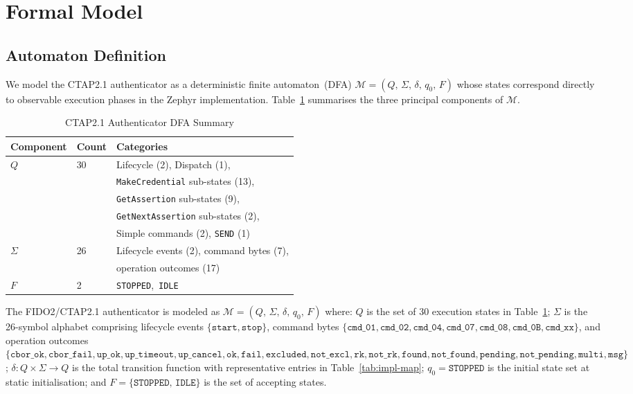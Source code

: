 \section{Formal Model}
\label{sec:formal}

\subsection{Automaton Definition}
\label{sec:formal:def}

We model the CTAP2.1 authenticator as a deterministic finite automaton~(DFA) $\mathcal{M} = (Q,\,\Sigma,\,\delta,\,q_0,\,F)$ whose states correspond directly to observable execution phases in the Zephyr implementation. Table~\ref{tab:dfa-summary} summarises the three principal components of $\mathcal{M}$.

\begin{table}[t]
\renewcommand{\arraystretch}{1.2}
\caption{CTAP2.1 Authenticator DFA Summary}
\label{tab:dfa-summary}
\centering
\begin{tabular}{@{}lll@{}}
\toprule
Component & Count & Categories \\
\midrule
$Q$ & 30 &
  Lifecycle (2), Dispatch (1), \\[-1pt]
  & & \texttt{MakeCredential} sub-states (13), \\[-1pt]
  & & \texttt{GetAssertion} sub-states (9), \\[-1pt]
  & & \texttt{GetNextAssertion} sub-states (2), \\[-1pt]
  & & Simple commands (2), \texttt{SEND} (1) \\[3pt]
$\Sigma$ & 26 &
  Lifecycle events (2), command bytes (7), \\[-1pt]
  & & operation outcomes (17) \\[3pt]
$F$ & 2 & \texttt{STOPPED},\ \texttt{IDLE} \\
\bottomrule
\end{tabular}
\end{table}

\begin{definition}
\label{def:dfa}
The FIDO2/CTAP2.1 authenticator is modeled as $\mathcal{M} = (Q,\,\Sigma,\,\delta,\,q_0,\,F)$ where: $Q$ is the set of 30 execution states in Table~\ref{tab:dfa-summary}; $\Sigma$ is the 26-symbol alphabet comprising lifecycle events $\{\mathtt{start},\mathtt{stop}\}$, command bytes $\{\mathtt{cmd\_01},\mathtt{cmd\_02},\mathtt{cmd\_04}, \mathtt{cmd\_07},\mathtt{cmd\_08},\mathtt{cmd\_0B}, \mathtt{cmd\_xx}\}$, and operation outcomes $\{\mathtt{cbor\_ok},\mathtt{cbor\_fail},\mathtt{up\_ok}, \mathtt{up\_timeout},\mathtt{up\_cancel},\mathtt{ok}, \mathtt{fail},\mathtt{excluded},\mathtt{not\_excl}, \mathtt{rk},\mathtt{not\_rk},\mathtt{found}, \mathtt{not\_found},\mathtt{pending},\mathtt{not\_pending}, \mathtt{multi},\mathtt{msg}\}$; $\delta : Q \times \Sigma \rightarrow Q$ is the total transition function with representative entries in Table~\ref{tab:impl-map}; $q_0 = \mathtt{STOPPED}$ is the initial state set at static initialisation; and $F = \{\mathtt{STOPPED},\,\mathtt{IDLE}\}$ is the set of accepting states.
\end{definition}

